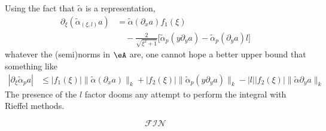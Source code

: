 Using the fact that $\tilde\alpha$ is a representation,
\[
	\begin{split}
		\partial_{\xi}(\tilde\alpha_{(\xi,l)}a)&=\tilde\alpha(\partial_xa)f_1(\xi)\\
		&\quad -\frac{ 2 }{ \sqrt{\xi^2+1} }\Big[ \tilde\alpha_p(y\partial_ya)-\tilde\alpha_p(\partial_ya)l\Big]
	\end{split}
\]
whatever the (semi)norms in $\eA$ are, one cannot hope a better upper bound that something like
\[
	\begin{split}
		| \partial_{\xi}\tilde\alpha_pa |&\leq | f_1(\xi) |\| \tilde\alpha(\partial_xa) \|_k+| f_2(\xi) |\| \tilde\alpha_p(y\partial_ya) \|_k-| l | |f_2(\xi) |\| \tilde\alpha\partial_ya \|_k
	\end{split}
\]
The presence of the $l$ factor dooms any attempt to perform the integral with Rieffel methods.

\[
	\mathcal{FIN}
\]
